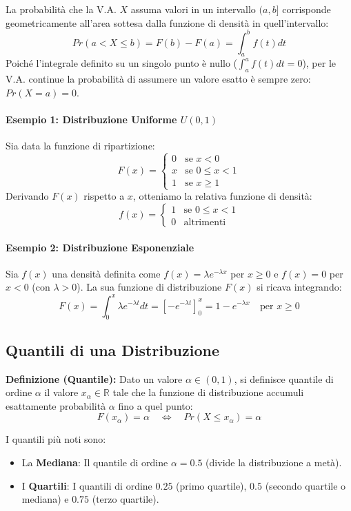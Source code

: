 \documentclass[12pt, a4paper]{article}
\begin{document}
La probabilità che la V.A. $X$ assuma valori in un intervallo $(a, b]$ corrisponde geometricamente all'area sottesa dalla funzione di densità in quell'intervallo:
$$ Pr(a < X \le b) = F(b) - F(a) = \int_a^b f(t) dt $$
Poiché l'integrale definito su un singolo punto è nullo ($\int_a^a f(t)dt = 0$), per le V.A. continue la probabilità di assumere un valore esatto è sempre zero: $Pr(X=a) = 0$.

\paragraph{Esempio 1: Distribuzione Uniforme $U(0,1)$}
Sia data la funzione di ripartizione:
$$
F(x) = 
\begin{cases} 
0 & \text{se } x < 0 \\
x & \text{se } 0 \le x < 1 \\
1 & \text{se } x \ge 1
\end{cases}
$$
Derivando $F(x)$ rispetto a $x$, otteniamo la relativa funzione di densità:
$$
f(x) = 
\begin{cases} 
1 & \text{se } 0 \le x < 1 \\
0 & \text{altrimenti}
\end{cases}
$$

\paragraph{Esempio 2: Distribuzione Esponenziale}
Sia $f(x)$ una densità definita come $f(x) = \lambda e^{-\lambda x}$ per $x \ge 0$ e $f(x)=0$ per $x < 0$ (con $\lambda > 0$). La sua funzione di distribuzione $F(x)$ si ricava integrando:
$$ F(x) = \int_0^x \lambda e^{-\lambda t} dt = \left[ -e^{-\lambda t} \right]_0^x = 1 - e^{-\lambda x} \quad \text{per } x \ge 0 $$

\subsection{Quantili di una Distribuzione}
\textbf{Definizione (Quantile):} Dato un valore $\alpha \in (0, 1)$, si definisce quantile di ordine $\alpha$ il valore $x_\alpha \in \mathbb{R}$ tale che la funzione di distribuzione accumuli esattamente probabilità $\alpha$ fino a quel punto:
$$ F(x_\alpha) = \alpha \quad \iff \quad Pr(X \le x_\alpha) = \alpha $$

I quantili più noti sono:
\begin{itemize}
    \item La \textbf{Mediana}: Il quantile di ordine $\alpha = 0.5$ (divide la distribuzione a metà).
    \item I \textbf{Quartili}: I quantili di ordine $0.25$ (primo quartile), $0.5$ (secondo quartile o mediana) e $0.75$ (terzo quartile).
\end{itemize}
\end{document}
